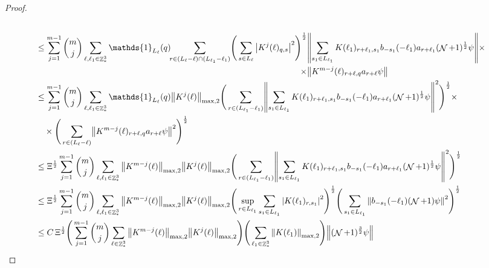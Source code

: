 \documentclass[sn-mathphys, Numbered ,a4paper]{sn-jnl}%
\DeclareMathOperator{\Z}{\mathbb{Z}}
\DeclareMathOperator{\NN}{\mathcal{N}}
\newcommand{\half}{\frac{1}{2}}
\theoremstyle{plain}
\theoremstyle{definition}
\theoremstyle{remark}
\theoremstyle{plain}
\theoremstyle{definition}
\theoremstyle{remark}
\begin{document}
\begin{proof}
\begin{alignat}{2}
\begin{aligned}[t]
	\end{aligned} \nonumber\\
	&\leq \sum\limits_{j=1}^{m-1} {{m}\choose j} \sum\limits_{\ell, \ell_1\in \Z^3_*} \mathds{1}_{L_{\ell}}(q)\!\! \sum\limits_{r\in (L_{\ell}-\ell) \cap (L_{\ell_1}-\ell_1)}\! \Bigg( \sum\limits_{s \in L_\ell}\begin{aligned}[t]
		\abs{K^{j}(\ell)_{q,s}}^2\Bigg)^\half &\norm{ \sum\limits_{ s_1 \in L_{\ell_1}}  K(\ell_1)_{r+\ell_1,s_1} b_{-s_1}(-\ell_1)  a_{r+\ell_1}(\NN+1)^\half\psi}\times\nonumber\\ \times&\norm{  K^{m-j}(\ell)_{r+\ell,q} a_{r+\ell} \psi }
	\end{aligned} \nonumber\\
	&\leq \sum\limits_{j=1}^{m-1} {{m}\choose j} \sum\limits_{\ell, \ell_1\in \Z^3_*} \mathds{1}_{L_{\ell}}(q) \norm{K^{j}(\ell)}_{\mathrm{max,2}} \Bigg( \sum\limits_{r\in  (L_{\ell_1}-\ell_1)}\! \norm{ \sum\limits_{ s_1 \in L_{\ell_1}}  K(\ell_1)_{r+\ell_1,s_1} b_{-s_1}(-\ell_1)  a_{r+\ell_1} (\NN+1)^\half\psi} ^2\Bigg)^\half \times\nonumber\\ &\quad\times\Bigg( \sum\limits_{r\in (L_{\ell}-\ell) }\!\norm{  K^{m-j}(\ell)_{r+\ell,q} a_{r+\ell} \psi }^2\Bigg)^\half\nonumber\\
	&\leq \Xi^\half \sum\limits_{j=1}^{m-1} {{m}\choose j} \sum\limits_{\ell, \ell_1\in \Z^3_*} \norm{K^{m-j}(\ell)}_{\mathrm{max,2}} \norm{K^{j}(\ell)}_{\mathrm{max,2}} \Bigg( \sum\limits_{r\in (L_{\ell_1}-\ell_1)}\! \norm{ \sum\limits_{ s_1 \in L_{\ell_1}}  K(\ell_1)_{r+\ell_1,s_1} b_{-s_1}(-\ell_1)  a_{r+\ell_1} (\NN+1)^\half\psi} ^2\Bigg)^\half \nonumber\\
	&\leq \Xi^\half \sum\limits_{j=1}^{m-1} {{m}\choose j} \sum\limits_{\ell, \ell_1\in \Z^3_*} \norm{K^{m-j}(\ell)}_{\mathrm{max,2}} \norm{K^{j}(\ell)}_{\mathrm{max,2}} \Bigg(\sup_{r \in L_{\ell_1}} \sum\limits_{ s_1 \in L_{\ell_1}}\abs{  K(\ell_1)_{r,s_1} }^2\Bigg)^\half \Bigg(  \sum\limits_{ s_1 \in L_{\ell_1}}\norm{   b_{-s_1}(-\ell_1)  (\NN+1)\psi} ^2\Bigg)^\half \nonumber\\
	&\leq C\, \Xi^\half \Bigg(\sum\limits_{j=1}^{m-1} {{m}\choose j} \sum\limits_{\ell \in \Z^3_*} \norm{K^{m-j}(\ell)}_{ \mathrm{max,2} } \norm{K^{j}(\ell)}_{\mathrm{max,2}}\Bigg) \Bigg(\sum\limits_{ \ell_1\in \Z^3_*}\norm{  K(\ell_1)}_{\mathrm{max,2}}\Bigg)  \norm{(\NN+1)^\frac{3}{2} \psi} \label{eq:estEQ1212}
\end{alignat} 


\end{proof}
\end{document}
